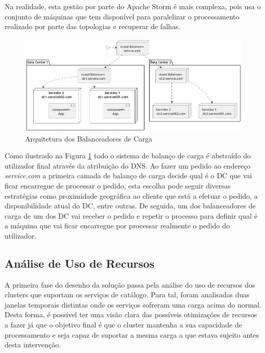 Na realidade, esta gestão por parte do Apache Storm é mais complexa, pois usa o conjunto de
máquinas que tem disponível para paralelizar o processamento realizado por parte das topologias e
recuperar de falhas.

\begin{figure}[H]
  \centerline{\includegraphics[scale=0.45]{media/content/analise/lb.png}}
  \caption{Arquitetura dos Balanceadores de Carga}
  \label{lb}
\end{figure}

Como ilustrado na Figura \ref{lb} todo o sistema de balanço de carga é abstraído do utilizador
final através da atribuição do \ac{DNS}. Ao fazer um pedido ao endereço \textit{service.com} a primeira
camada de balanço de carga decide qual é o \ac{DC} que vai ficar encarregue de processar o pedido,
esta escolha pode seguir diversas estratégias como proximidade geográfica ao cliente que está a 
efetuar o pedido, a disponibilidade atual do \ac{DC}, entre outras. De seguida, um dos 
balanceadores de carga de um dos \ac{DC} vai receber o pedido e repetir o processo para definir
qual é a máquina que vai ficar encarregue por processar realmente o pedido do utilizador.

\subsection{Análise de Uso de Recursos}

A primeira fase do desenho da solução passa pela análise do uso de recursos dos \glspl{cluster}
que suportam os serviços de catálogo. Para tal, foram analisadas duas janelas temporais distintas
onde os serviços sofreram uma carga acima do normal. Desta forma, é possível ter uma visão clara
das possíveis otimizações de recursos a fazer já que o objetivo final é que o \gls{cluster}
mantenha a sua capacidade de processamento e seja capaz de suportar a mesma carga a que estava
sujeito antes desta intervenção.


